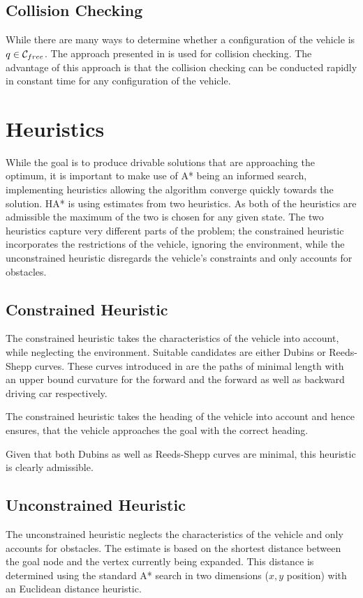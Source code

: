 \subsection{Collision Checking}
While there are many ways to determine whether a configuration of the vehicle is $q \in \mathcal{C}_{free}$. The approach presented in  is used for collision checking. The advantage of this approach is that the collision checking can be conducted rapidly in constant time for any configuration of the vehicle.

\section{Heuristics}
While the goal is to produce drivable solutions that are approaching the optimum, it is important to make use of A* being an informed search, implementing heuristics allowing the algorithm converge quickly towards the solution. HA* is using estimates from two heuristics. As both of the heuristics are admissible the maximum of the two is chosen for any given state. The two heuristics capture very different parts of the problem; the constrained heuristic incorporates the restrictions of the vehicle, ignoring the environment, while the unconstrained heuristic disregards the vehicle's constraints and only accounts for obstacles.


\subsection{Constrained Heuristic}
The constrained heuristic takes the characteristics of the vehicle into account, while neglecting the environment. Suitable candidates are either Dubins or Reeds-Shepp curves. These curves introduced in  are the paths of minimal length with an upper bound curvature for the forward and the forward as well as backward driving car respectively.

The constrained heuristic takes the heading of the vehicle into account and hence ensures, that the vehicle approaches the goal with the correct heading.

Given that both Dubins as well as Reeds-Shepp curves are minimal, this heuristic is clearly admissible.

\subsection{Unconstrained Heuristic}
The unconstrained heuristic neglects the characteristics of the vehicle and only accounts for obstacles. The estimate is based on the shortest distance between the goal node and the vertex currently being expanded. This distance is determined using the standard A* search in two dimensions ($x,y$ position) with an Euclidean distance heuristic.

